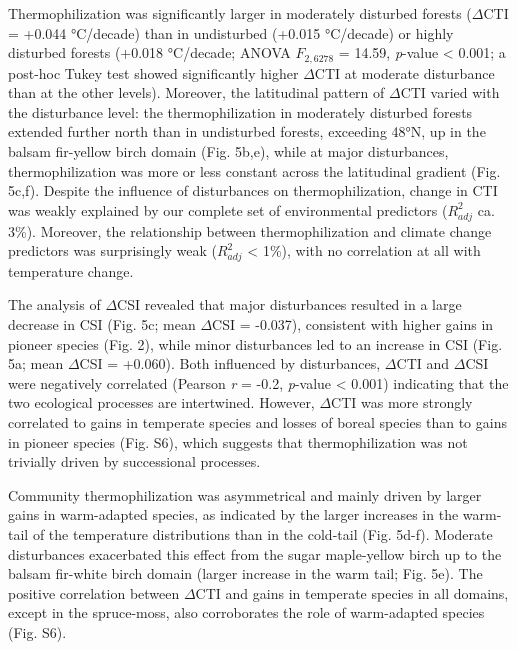 \documentclass[a4paperpaper,]{article}
\begin{document}
Thermophilization was significantly larger in moderately disturbed
forests (\(\Delta\)CTI = +0.044 °C/decade) than in undisturbed (+0.015
°C/decade) or highly disturbed forests (+0.018 °C/decade; ANOVA
\(F_{2, 6278}\) = 14.59, \emph{p}-value \textless{} 0.001; a post-hoc
Tukey test showed significantly higher \(\Delta\)CTI at moderate
disturbance than at the other levels). Moreover, the latitudinal pattern
of \(\Delta\)CTI varied with the disturbance level: the
thermophilization in moderately disturbed forests extended further north
than in undisturbed forests, exceeding 48°N, up in the balsam fir-yellow
birch domain (Fig. 5b,e), while at major disturbances, thermophilization
was more or less constant across the latitudinal gradient (Fig. 5c,f).
Despite the influence of disturbances on thermophilization, change in
CTI was weakly explained by our complete set of environmental predictors
(\(R^2_{adj}\) ca. 3\%). Moreover, the relationship between
thermophilization and climate change predictors was surprisingly weak
(\(R^2_{adj}\) \textless{} 1\%), with no correlation at all with
temperature change.

The analysis of \(\Delta\)CSI revealed that major disturbances resulted
in a large decrease in CSI (Fig. 5c; mean \(\Delta\)CSI = -0.037),
consistent with higher gains in pioneer species (Fig. 2), while minor
disturbances led to an increase in CSI (Fig. 5a; mean \(\Delta\)CSI =
+0.060). Both influenced by disturbances, \(\Delta\)CTI and
\(\Delta\)CSI were negatively correlated (Pearson \emph{r} = -0.2,
\emph{p}-value \textless{} 0.001) indicating that the two ecological
processes are intertwined. However, \(\Delta\)CTI was more strongly
correlated to gains in temperate species and losses of boreal species
than to gains in pioneer species (Fig. S6), which suggests that
thermophilization was not trivially driven by successional processes.

Community thermophilization was asymmetrical and mainly driven by larger
gains in warm-adapted species, as indicated by the larger increases in
the warm-tail of the temperature distributions than in the cold-tail
(Fig. 5d-f). Moderate disturbances exacerbated this effect from the
sugar maple-yellow birch up to the balsam fir-white birch domain (larger
increase in the warm tail; Fig. 5e). The positive correlation between
\(\Delta\)CTI and gains in temperate species in all domains, except in
the spruce-moss, also corroborates the role of warm-adapted species
(Fig. S6).
\end{document}
